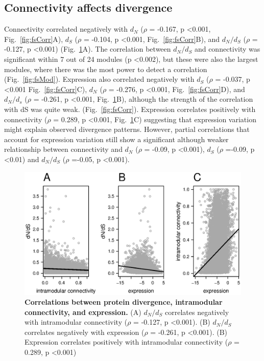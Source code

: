 \subsection{Connectivity affects divergence}
Connectivity correlated negatively with  $d_{N}$ ($\rho$ = -0.167, p \textless 0.001,  Fig.~\ref{fig:fsCorr}A), $d_{S}$ ($\rho$ = -0.104, p \textless 0.001, Fig.~\ref{fig:fsCorr}B), and $d_{N}/d_{S}$ ($\rho$ = -0.127, p \textless 0.001) (Fig.~\ref{fig:f1}A). The correlation between $d_{N}/d_{S}$ and connectivity was significant within 7 out of 24 modules (p \textless 0.002), but these were also the largest modules, where there was the most power to detect a correlation (Fig.~\ref{fig:fsMod}). Expression also correlated negatively with $d_{S}$ ($\rho$ = -0.037, p \textless 0.001 Fig.~\ref{fig:fsCorr}C), $d_{N}$ ($\rho$ = -0.276, p \textless 0.001, Fig.~\ref{fig:fsCorr}D), and $d_{N}/d_{s}$ ($\rho$ = -0.261, p \textless 0.001, Fig.~\ref{fig:f1}B),  although the strength of the correlation with dS was quite weak. (Fig.~\ref{fig:fsCorr}). Expression correlates positively with connectivity ($\rho$ = 0.289, p \textless 0.001, Fig.~\ref{fig:f1}C) suggesting that expression variation might explain observed divergence patterns. However, partial correlations that account for expression variation still show a significant although weaker relationship between connectivity and $d_{N}$ ($\rho$ = -0.09, p \textless 0.001), $d_{S}$ ($\rho$ =-0.09, p \textless 0.01) and $d_{N}/d_{S}$ ($\rho$ =-0.05, p \textless 0.001). 

\begin{figure}[ht!]
\centering
\includegraphics[width=\linewidth]{Ch4Fig1}
\caption{\textbf{Correlations between protein divergence, intramodular connectivity, and expression.} (A) $d_{N}/d_{S}$ correlates negatively with intramodular connectivity ($\rho$ = -0.127, p \textless 0.001). (B) $d_{N}/d_{S}$ correlates negatively with expression ($\rho$ = -0.261, p \textless 0.001). (B) Expression correlates positively with intramodular connectivity ($\rho$ = 0.289, p \textless 0.001)}
\label{fig:f1}
\end{figure}

